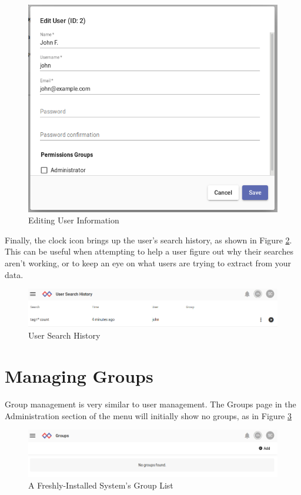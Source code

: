 \begin{figure}
	\includegraphics[width=0.7\linewidth]{images/edituser.png}
	\caption{Editing User Information}
	\label{fig:edituser}
\end{figure}

Finally, the clock icon brings up the user's search history, as shown in Figure \ref{fig:userhistory}.
This can be useful when attempting to help a user figure out why their searches
aren't working, or to keep an eye on what users are trying to extract
from your data.

\begin{figure}
	\includegraphics{images/userhistory.png}
	\caption{User Search History}
	\label{fig:userhistory}
\end{figure}



\section{Managing Groups}

Group management is very similar to user management. The Groups page in
the Administration section of the menu will initially show no groups, as in
Figure \ref{fig:fresh-groups}

\begin{figure}[H]
	\includegraphics{images/empty-groups.png}
	\caption{A Freshly-Installed System's Group List}
	\label{fig:fresh-groups}
\end{figure}

